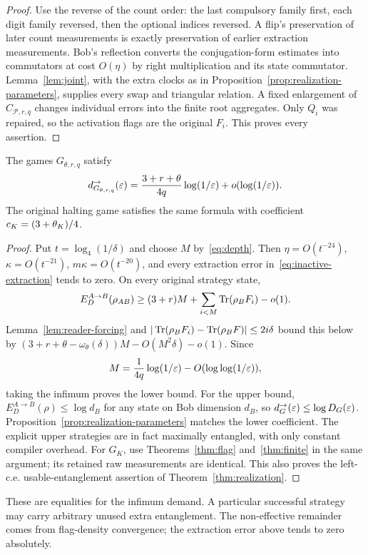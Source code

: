\begin{proof}
Use the reverse of the count order: the last compulsory family first, each digit family reversed, then the optional indices reversed. A flip's preservation of later count measurements is exactly preservation of earlier extraction measurements. Bob's reflection converts the conjugation-form estimates into commutators at cost $O(\eta)$ by right multiplication and its state commutator. Lemma~\ref{lem:joint}, with the extra clocks as in Proposition~\ref{prop:realization-parameters}, supplies every swap and triangular relation. A fixed enlargement of $C_{\mathcal P,r,q}$ changes individual errors into the finite root aggregates. Only $Q_i$ was repaired, so the activation flags are the original $F_i$. This proves every assertion.
\end{proof}

\begin{theorem}\label{thm:usable-parameters}
The games $G_{\theta,r,q}$ satisfy
\begin{equation}\label{eq:usable-parameters}
 d^\to_{G_{\theta,r,q}}(\varepsilon)
 =\frac{3+r+\theta}{4q}\log(1/\varepsilon)+o(\log(1/\varepsilon)).
\end{equation}
The original halting game satisfies the same formula with coefficient $c_K=(3+\theta_K)/4$.
\end{theorem}
\begin{proof}
Put $t=\log_4(1/\delta)$ and choose $M$ by~\eqref{eq:depth}. Then $\eta=O(t^{-24})$, $\kappa=O(t^{-21})$, $m\kappa=O(t^{-20})$, and every extraction error in~\eqref{eq:inactive-extraction} tends to zero. On every original strategy state,
\[
 E_D^{A\to B}(\rho_{AB})\ge(3+r)M+\sum_{i<M}\operatorname{Tr}(\rho_BF_i)-o(1).
\]
Lemma~\ref{lem:reader-forcing} and $|\operatorname{Tr}(\rho_BF_i)-\operatorname{Tr}(\rho_BF)|\le2i\delta$ bound this below by $(3+r+\theta-\omega_\theta(\delta))M-O(M^2\delta)-o(1)$. Since
\[
 M=\frac1{4q}\log(1/\varepsilon)-O(\log\log(1/\varepsilon)),
\]
taking the infimum proves the lower bound. For the upper bound, $E_D^{A\to B}(\rho)\le\log d_B$ for any state on Bob dimension $d_B$, so $d^\to_G(\varepsilon)\le\log D_G(\varepsilon)$. Proposition~\ref{prop:realization-parameters} matches the lower coefficient. The explicit upper strategies are in fact maximally entangled, with only constant compiler overhead. For $G_K$, use Theorems~\ref{thm:flag} and~\ref{thm:finite} in the same argument; its retained raw measurements are identical. This also proves the left-c.e. usable-entanglement assertion of Theorem~\ref{thm:realization}.
\end{proof}

These are equalities for the infimum demand. A particular successful strategy may carry arbitrary unused extra entanglement. The non-effective remainder comes from flag-density convergence; the extraction error above tends to zero absolutely.

